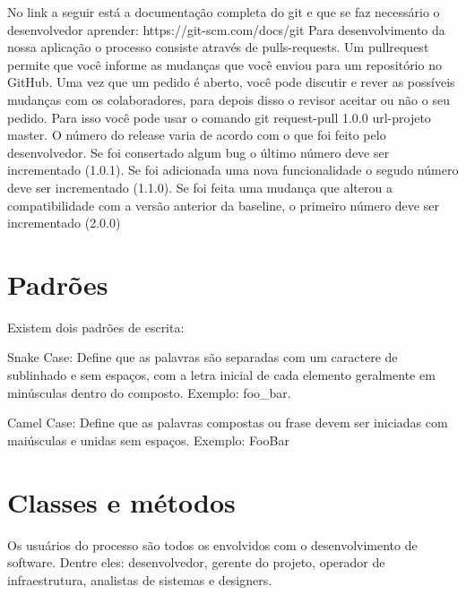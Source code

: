 \documentclass[	DIV=calc,%
							paper=a4,%
							fontsize=12pt,%
							onecolumn]{scrartcl}	 					%
\begin{document}
No link a seguir está a documentação completa do git e que se faz necessário o desenvolvedor
aprender: https://git-scm.com/docs/git
Para desenvolvimento da nossa aplicação o processo consiste através de pulls-requests. Um pullrequest
permite que você informe as mudanças que você enviou para um repositório no GitHub. Uma
vez que um pedido é aberto, você pode discutir e rever as possíveis mudanças com os colaboradores,
para depois disso o revisor aceitar ou não o seu pedido.
Para isso você pode usar o comando git request-pull 1.0.0 url-projeto master.
O número do release varia de acordo com o que foi feito pelo desenvolvedor. Se foi consertado
algum bug o último número deve ser incrementado (1.0.1). Se foi adicionada uma nova funcionalidade o
segudo número deve ser incrementado (1.1.0). Se foi feita uma mudança que alterou a compatibilidade
com a versão anterior da baseline, o primeiro número deve ser incrementado (2.0.0)

\section{Padrões}

Existem dois padrões de escrita:

Snake Case: Define que as palavras são separadas com um caractere de sublinhado  e sem espaços,
com a letra inicial de cada elemento geralmente em minúsculas dentro do composto. Exemplo: foo_bar.

Camel Case: Define que as palavras compostas ou frase devem ser iniciadas com maiúsculas e unidas
sem espaços. Exemplo: FooBar


\section{Classes e métodos}
Os usuários do processo são todos os envolvidos com o desenvolvimento de software. Dentre eles: desenvolvedor, gerente do projeto, operador de infraestrutura, analistas de sistemas e designers.
\end{document}
